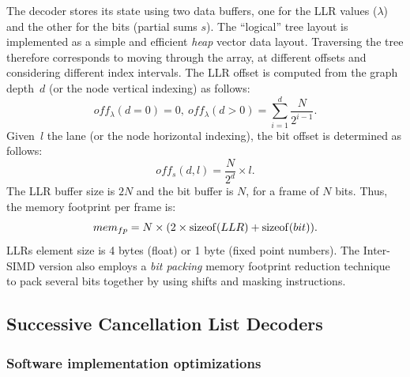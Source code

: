 The decoder stores its state using two data buffers, one for the LLR values
($\lambda$) and the other for the bits (partial sums $s$). The ``logical'' tree
layout is implemented as a simple and efficient \emph{heap} vector data layout.
Traversing the tree therefore corresponds to moving through the array, at
different offsets and considering different index intervals. The LLR offset is
computed from the graph depth~$d$ (or the node vertical indexing) as follows:
\begin{equation}
  off_{\lambda}(d = 0) = 0,~off_{\lambda}(d > 0) =
  \sum\limits_{i = 1}^{d} \frac{N}{2^{i-1}}.
\end{equation}
Given~$l$ the lane (or the node horizontal indexing), the bit offset is
determined as follows:
\begin{equation}
  off_{s}(d,l) = \frac{N}{2^d} \times l.
\end{equation}
The LLR buffer size is $2N$ and the bit buffer is $N$, for a frame of $N$ bits.
Thus, the memory footprint per frame is:
\begin{equation}
  mem_{fp} = N \times (2 \times \operatorname*{sizeof}(LLR) + \operatorname*{sizeof}(bit)).
\end{equation}
LLRs element size is 4 bytes (float) or 1 byte (fixed point numbers). The
Inter-SIMD version also employs a \emph{bit packing} memory footprint reduction
technique~\cite{LeGal2015a} to pack several bits together by using shifts and
masking instructions.

\subsection{Successive Cancellation List Decoders}

\subsubsection{Software implementation optimizations}
\label{sec:polar_implem}

